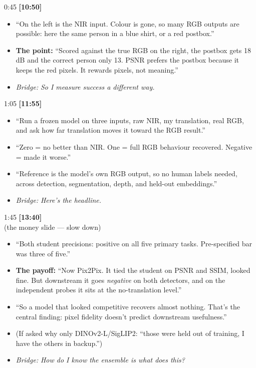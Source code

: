 \documentclass[11pt]{article}
\newcommand{\slidehd}[3]{%
  \vspace{6pt}\noindent{\bfseries\textcolor{ICLBlue}{#1}}%
  \hfill{\small #2 \quad\textbf{[#3]}}\\[1pt]}
\newcommand{\bridge}[1]{\textit{\textcolor{ICLBlue}{Bridge:}} \textit{#1}}
\begin{document}
\slidehd{11. Why not PSNR?}{0:45}{10:50}
\begin{itemize}
	\item ``On the left is the NIR input. Colour is gone, so many RGB outputs are possible: here the same person in a blue shirt, or a red postbox.''
	\item \textcolor{Hi}{\textbf{The point:}} ``Scored against the true RGB on the right, the postbox gets 18\,dB and the correct person only 13. PSNR prefers the postbox because it keeps the red pixels. It rewards pixels, not meaning.''
	\item \bridge{So I measure success a different way.}
\end{itemize}

\slidehd{12. Gap closure}{1:05}{11:55}
\begin{itemize}
	\item ``Run a frozen model on three inputs, raw NIR, my translation, real RGB, and ask how far translation moves it toward the RGB result.''
	\item ``Zero = no better than NIR. One = full RGB behaviour recovered. Negative = made it worse.''
	\item ``Reference is the model's own RGB output, so no human labels needed, across detection, segmentation, depth, and held-out embeddings.''
	\item \bridge{Here's the headline.}
\end{itemize}

\slidehd{13. Headline result}{1:45}{13:40} \textnormal{\small\textcolor{Hi}{(the money slide --- slow down)}}
\begin{itemize}
	\item ``Both student precisions: positive on all five primary tasks. Pre-specified bar was three of five.''
	\item \textcolor{Hi}{\textbf{The payoff:}} ``Now Pix2Pix. It tied the student on PSNR and SSIM, looked fine. But downstream it goes \emph{negative} on both detectors, and on the independent probes it sits at the no-translation level.''
	\item ``So a model that looked competitive recovers almost nothing. That's the central finding: pixel fidelity doesn't predict downstream usefulness.''
	\item (If asked why only DINOv2-L/SigLIP2: ``those were held out of training, I have the others in backup.'')
	\item \bridge{How do I know the ensemble is what does this?}
\end{itemize}
\end{document}
